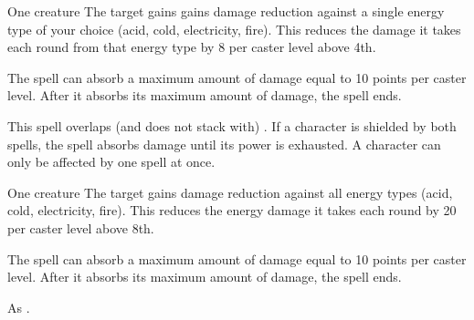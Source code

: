 \begin{spellheader}
\end{spellheader}
\begin{spelleffects}
    \begin{spelltarget}{One creature}
        \spelleffect The target gains gains damage reduction against a single energy type of your choice (acid, cold, electricity, fire). This reduces the damage it takes each round from that energy type by 8  per caster level above 4th.
        \par The spell can absorb a maximum amount of damage equal to 10 points per caster level. After it absorbs its maximum amount of damage, the spell ends.
    \end{spelltarget}
\end{spelleffects}
\begin{spellfooter}
    \spellnotes This spell overlaps (and does not stack with) . If a character is shielded by both spells, the  spell absorbs damage until its power is exhausted. A character can only be affected by one  spell at once.
\end{spellfooter}

\begin{spellheader}
\end{spellheader}
\begin{spelleffects}
    \begin{spelltarget}{One creature}
        \spelleffect The target gains damage reduction against all energy types (acid, cold, electricity, fire). This reduces the energy damage it takes each round by 20  per caster level above 8th.
        \par The spell can absorb a maximum amount of damage equal to 10 points per caster level. After it absorbs its maximum amount of damage, the spell ends.
    \end{spelltarget}
\end{spelleffects}
\begin{spellfooter}
    \spellnotes As .
\end{spellfooter}

